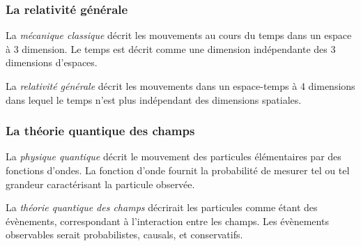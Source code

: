   \subsubsection{La relativité générale}

La {\it mécanique classique} décrit les mouvements au cours du temps dans un espace à 3 dimension. Le temps est décrit comme une dimension indépendante des 3 dimensions d'espaces.

La {\it relativité générale} décrit les mouvements dans un espace-temps à 4 dimensions dans lequel le temps n'est plus indépendant des dimensions spatiales.

  \subsubsection{La théorie quantique des champs}

La {\it physique quantique} décrit le mouvement des particules élémentaires par des fonctions d'ondes. La fonction d'onde fournit la probabilité de mesurer tel ou tel grandeur caractérisant la particule observée.

La {\it théorie quantique des champs} décrirait les particules comme étant des évènements, correspondant à l'interaction entre les champs. Les évènements observables serait probabilistes, causals, et conservatifs.






